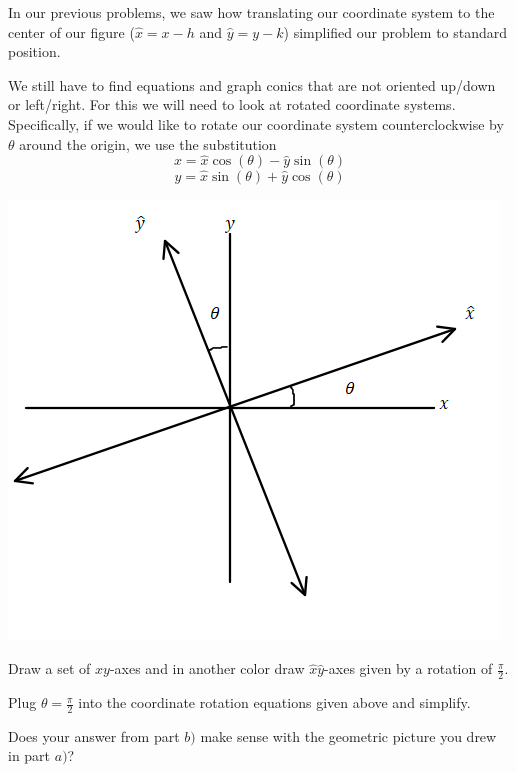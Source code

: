 \begin{info} In our previous problems, we saw how translating our coordinate system to the center of our figure ($\hat{x}=x-h$ and $\hat{y}=y-k$) simplified our problem to standard position.

We still have to find equations and graph conics that are not oriented up/down or left/right. For this we will need to look at rotated coordinate systems. Specifically, if we would like to rotate our coordinate system counterclockwise by $\theta$ around the origin, we use the substitution $$x=\hat{x} \cos(\theta) - \hat{y} \sin(\theta) $$ $$y=\hat{x} \sin(\theta) + \hat{y} \cos(\theta)$$

\begin{center} \includegraphics{rotation.png} \end{center}
\end{info}
\bq \be
\item Draw a set of $xy$-axes and in another color draw $\hat{x}\hat{y}$-axes given by a rotation of $\frac{\pi}{2}$.
\item Plug $\theta = \frac{\pi}{2}$ into the coordinate rotation equations given above and simplify.
\item Does your answer from part $b)$ make sense with the geometric picture you drew in part $a)$?
\ee \eq

